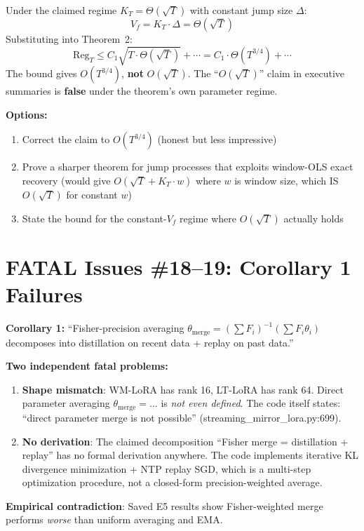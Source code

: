 \documentclass[11pt,a4paper]{article}
\begin{document}
\begin{whywrongbox}
Under the claimed regime $K_T = \Theta(\sqrt{T})$ with constant jump size
$\Delta$:
\[
V_f = K_T \cdot \Delta = \Theta(\sqrt{T})
\]
Substituting into Theorem~2:
\[
\mathrm{Reg}_T \leq C_1\sqrt{T \cdot \Theta(\sqrt{T})} + \cdots
= C_1 \cdot \Theta(T^{3/4}) + \cdots
\]
The bound gives $O(T^{3/4})$, \textbf{not} $O(\sqrt{T})$.
The ``$O(\sqrt{T})$'' claim in executive summaries is \textbf{false}
under the theorem's own parameter regime.
\end{whywrongbox}

\begin{afterbox}
\textbf{Options:}
\begin{enumerate}[nosep]
\item Correct the claim to $O(T^{3/4})$ (honest but less impressive)
\item Prove a sharper theorem for jump processes that exploits window-OLS
      exact recovery (would give $O(\sqrt{T} + K_T \cdot w)$ where $w$ is
      window size, which IS $O(\sqrt{T})$ for constant $w$)
\item State the bound for the constant-$V_f$ regime where $O(\sqrt{T})$
      actually holds
\end{enumerate}
\end{afterbox}

\section{FATAL Issues \#18--19: Corollary 1 Failures}

\begin{beforebox}
\textbf{Corollary 1:}
``Fisher-precision averaging $\theta_{\text{merge}} = (\sum F_i)^{-1}(\sum F_i \theta_i)$
decomposes into distillation on recent data + replay on past data.''
\end{beforebox}

\begin{whywrongbox}
\textbf{Two independent fatal problems:}
\begin{enumerate}
\item \textbf{Shape mismatch}: WM-LoRA has rank 16, LT-LoRA has rank 64.
      Direct parameter averaging $\theta_{\text{merge}} = \ldots$ is
      \emph{not even defined}. The code itself states: ``direct parameter
      merge is not possible'' (streaming\_mirror\_lora.py:699).

\item \textbf{No derivation}: The claimed decomposition
      ``Fisher merge = distillation + replay'' has no formal derivation
      anywhere. The code implements iterative KL divergence minimization +
      NTP replay SGD, which is a multi-step optimization procedure, not a
      closed-form precision-weighted average.
\end{enumerate}

\textbf{Empirical contradiction}: Saved E5 results show Fisher-weighted
merge performs \emph{worse} than uniform averaging and EMA.
\end{whywrongbox}
\end{document}
